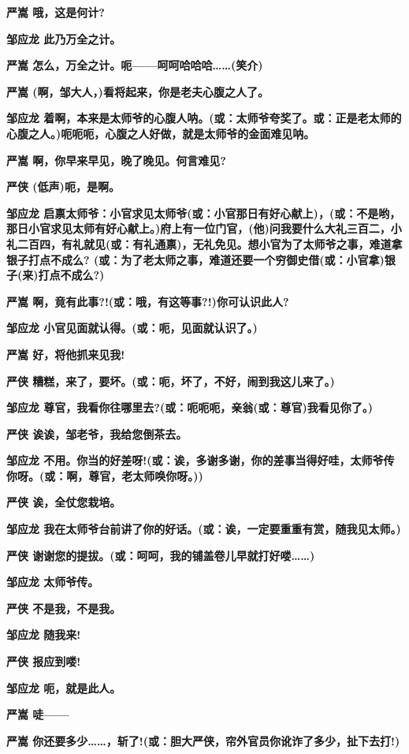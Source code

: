 \textbf{严嵩 哦，这是何计?}

\textbf{邹应龙 此乃万全之计。}

\textbf{严嵩 怎么，万全之计。呃------呵呵哈哈哈\ldots{}\ldots{}(笑介)}

\textbf{严嵩 (啊，邹大人，)看将起来，你是老夫心腹之人了。}

\textbf{邹应龙
着啊，本来是太师爷的心腹人呐。(或：太师爷夸奖了。或：正是老太师的心腹之人。)呃呃呃，心腹之人好做，就是太师爷的金面难见呐。}

\textbf{严嵩 啊，你早来早见，晚了晚见。何言难见?}

\textbf{严侠 (低声)呃，是啊。}

\textbf{邹应龙
启禀太师爷：小官求见太师爷(或：小官那日有好心献上)，(或：不是哟，那日小官求见太师有好心献上。)府上有一位门官，(他)问我要什么大礼三百二，小礼二百四，有礼就见(或：有礼通禀)，无礼免见。想小官为了太师爷之事，难道拿银子打点不成么?
(或：为了老太师之事，难道还要一个穷御史借(或：小官拿)银子(来)打点不成么?)}

\textbf{严嵩 啊，竟有此事?!(或：哦，有这等事?!)你可认识此人?}

\textbf{邹应龙 小官见面就认得。(或：呃，见面就认识了。)}

\textbf{严嵩 好，将他抓来见我!}

\textbf{严侠 糟糕，来了，要坏。(或：呃，坏了，不好，闹到我这儿来了。)}

\textbf{邹应龙
尊官，我看你往哪里去?(或：呃呃呃，亲翁(或：尊官)我看见你了。)}

\textbf{严侠 诶诶，邹老爷，我给您倒茶去。}

\textbf{邹应龙
不用。你当的好差呀!(或：诶，多谢多谢，你的差事当得好哇，太师爷传你呀。(或：啊，尊官，老太师唤你呀。))}

\textbf{严侠 诶，全仗您栽培。}

\textbf{邹应龙
我在太师爷台前讲了你的好话。(或：诶，一定要重重有赏，随我见太师。)}

\textbf{严侠
谢谢您的提拔。(或：呵呵，我的铺盖卷儿早就打好喽\ldots{}\ldots{})}

\textbf{邹应龙 太师爷传。}

\textbf{严侠 不是我，不是我。}

\textbf{邹应龙 随我来!}

\textbf{严侠 报应到喽!}

\textbf{邹应龙 呃，就是此人。}

\textbf{严嵩 唗------}

\textbf{严嵩
你还要多少\ldots{}\ldots{}，斩了!(或：胆大严侠，帘外官员你讹诈了多少，扯下去打!)}

